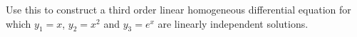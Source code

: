 \documentclass{ximera}
\begin{document}
\begin{enumerate}
Use this to construct a third order linear homogeneous differential equation for which $y_1=x$, $y_2=x^2$ and $y_3=e^x$ are linearly independent solutions. 


\end{enumerate}
\end{document}

